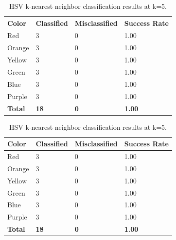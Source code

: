 \documentclass[twoside]{IEEEtran}
\begin{document}
\begin{table}[!b]
    \begin{minipage}{\columnwidth}
        \centering
        \caption{HSV k-nearest neighbor classification results at k=3.}%
        \label{hsv_knn_3}
        \begin{tabular}{ l l l l }
            \toprule
            \bfseries Color & \bfseries Classified & \bfseries Misclassified & \bfseries Success Rate \\
            \midrule
            Red             & 3                    & 0                       & 1.00                   \\
            Orange          & 3                    & 0                       & 1.00                   \\
            Yellow          & 3                    & 0                       & 1.00                   \\
            Green           & 3                    & 0                       & 1.00                   \\
            Blue            & 3                    & 0                       & 1.00                   \\
            Purple          & 3                    & 0                       & 1.00                   \\
            \midrule
            \bfseries Total & \bfseries 18         & \bfseries 0             & \bfseries 1.00         \\
            \bottomrule
        \end{tabular}
    \end{minipage}%
    \begin{minipage}{\columnwidth}
        \centering
        \caption{HSV k-nearest neighbor classification results at k=5.}%
        \label{hsv_knn_5}
        \begin{tabular}{ l l l l }
            \toprule
            \bfseries Color & \bfseries Classified & \bfseries Misclassified & \bfseries Success Rate \\
            \midrule
            Red             & 3                    & 0                       & 1.00                   \\
            Orange          & 3                    & 0                       & 1.00                   \\
            Yellow          & 3                    & 0                       & 1.00                   \\
            Green           & 3                    & 0                       & 1.00                   \\
            Blue            & 3                    & 0                       & 1.00                   \\
            Purple          & 3                    & 0                       & 1.00                   \\
            \midrule
            \bfseries Total & \bfseries 18         & \bfseries 0             & \bfseries 1.00         \\
            \bottomrule
        \end{tabular}
    \end{minipage}
\end{table}
\end{document}
